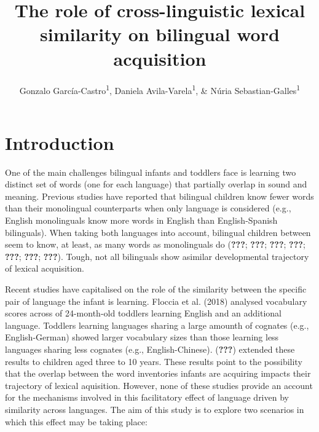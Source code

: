 \documentclass[english,man,man,floatsintext]{apa6}
\author{Gonzalo García-Castro\textsuperscript{1}, Daniela Avila-Varela\textsuperscript{1}, \& Núria Sebastian-Galles\textsuperscript{1}}
\affiliation{
\vspace{0.5cm}
\textsuperscript{1} Center for Brain and Cognition, Universitat Pompeu Fabra}
\title{The role of cross-linguistic lexical similarity on bilingual word acquisition}
\date{}
\begin{document}
\maketitle

\hypertarget{introduction}{%
\section{Introduction}\label{introduction}}

One of the main challenges bilingual infants and toddlers face is learning two distinct set of words (one for each language) that partially overlap in sound and meaning. Previous studies have reported that bilingual children know fewer words than their monolingual counterparts when only language is considered (e.g., English monolinguals know more words in English than English-Spanish bilinguals). When taking both languages into account, bilingual children between seem to know, at least, as many words as monolinguals do ({\textbf{???}}; {\textbf{???}}; {\textbf{???}}; {\textbf{???}}; {\textbf{???}}; {\textbf{???}}; {\textbf{???}}). Tough, not all bilinguals show asimilar developmental trajectory of lexical acquisition.

Recent studies have capitalised on the role of the similarity between the specific pair of language the infant is learning. Floccia et al. (2018) analysed vocabulary scores across of 24-month-old toddlers learning English and an additional language. Toddlers learning languages sharing a large amounth of cognates (e.g., English-German) showed larger vocabulary sizes than those learning less languages sharing less cognates (e.g., English-Chinese). ({\textbf{???}}) extended these results to children aged three to 10 years. These results point to the possibility that the overlap between the word inventories infants are acquiring impacts their trajectory of lexical aquisition. However, none of these studies provide an account for the mechanisms involved in this facilitatory effect of language driven by similarity across languages. The aim of this study is to explore two scenarios in which this effect may be taking place:
\end{document}
